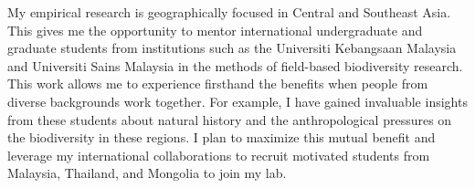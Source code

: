 My empirical research is geographically focused in Central and Southeast Asia.
This gives me the opportunity to mentor international undergraduate and
graduate students from institutions such as the Universiti Kebangsaan Malaysia
and Universiti Sains Malaysia in the methods of field-based biodiversity
research.
This work allows me to experience firsthand the benefits when people from
diverse backgrounds work together.
For example, I have gained invaluable insights from these students about
natural history and the anthropological pressures on the biodiversity in these
regions.
I plan to maximize this mutual benefit and leverage my international
collaborations to recruit motivated students from Malaysia, Thailand, and
Mongolia to join my lab.


